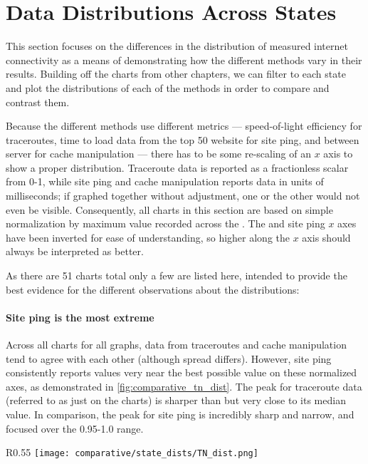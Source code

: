 \section{Data Distributions Across States}\label{sec:comparative-distribution}

This section focuses on the differences in the distribution of measured internet connectivity as a means of demonstrating how the different methods vary in their results. Building off the \kde charts from other chapters, we can filter to each state and plot the distributions of each of the methods in order to compare and contrast them.

Because the different methods use different metrics --- speed-of-light efficiency for traceroutes, time to load data from the top 50 website for site ping, and \rtt between \dns server for \dns cache manipulation --- there has to be some re-scaling of an $x$ axis to show a proper distribution. Traceroute data is reported as a fractionless scalar from 0-1, while site ping and \dns cache manipulation reports data in units of milliseconds; if graphed together without adjustment, one or the other would not even be visible. Consequently, all charts in this section are based on simple normalization by maximum value recorded across the \us. The \dns and site ping $x$ axes have been inverted for ease of understanding, so higher along the $x$ axis should always be interpreted as better.

As there are 51 charts total only a few are listed here, intended to provide the best evidence for the different observations about the distributions:

\paragraph{Site ping is the most extreme} Across all \kde charts for all graphs, data from traceroutes and \dns cache manipulation tend to agree with each other (although spread differs). However, site ping consistently reports values very near the best possible value on these normalized axes, as demonstrated in \cref{fig:comparative_tn_dist}. The peak for traceroute data (referred to as just \caida on the charts) is sharper than \dns but very close to its median value. In comparison, the peak for site ping is incredibly sharp and narrow, and focused over the 0.95-1.0 range.

\begin{wrapfigure}[16]{R}{0.55\textwidth}
    \centering
    \texttt{[image: comparative/state\_dists/TN\_dist.png]}
    \caption{Tennessee data distributions}
    \label{fig:comparative_tn_dist}
\end{wrapfigure}

